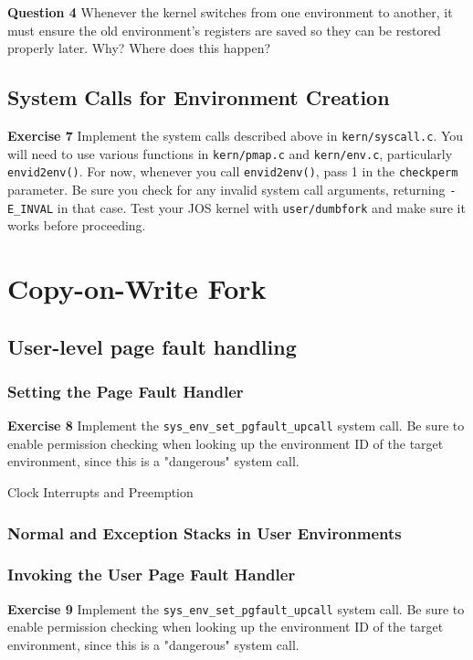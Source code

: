 \documentclass[11pt]{article}
\begin{document}
\begin{framed}
\noindent\textbf{Question 4} Whenever the kernel switches from one environment to another, it must ensure the old environment's registers are saved so they can be restored properly later. Why? Where does this happen?
\end{framed}

\subsection{System Calls for Environment Creation}
\begin{framed}
\noindent\textbf{Exercise 7} Implement the system calls described above in \lstinline|kern/syscall.c|. You will need to use various functions in \lstinline|kern/pmap.c| and \lstinline|kern/env.c|, particularly \lstinline|envid2env()|. For now, whenever you call \lstinline|envid2env()|, pass 1 in the \lstinline|checkperm| parameter. Be sure you check for any invalid system call arguments, returning \lstinline|-E_INVAL| in that case. Test your JOS kernel with \lstinline|user/dumbfork| and make sure it works before proceeding.
\end{framed}

\section{Copy-on-Write Fork}

\subsection{User-level page fault handling}
\subsubsection{Setting the Page Fault Handler}
\begin{framed}
\noindent\textbf{Exercise 8} Implement the \lstinline|sys_env_set_pgfault_upcall| system call. Be sure to enable permission checking when looking up the environment ID of the target environment, since this is a "dangerous" system call.
\end{framed}Clock Interrupts and Preemption
\subsubsection{Normal and Exception Stacks in User Environments}
\subsubsection{Invoking the User Page Fault Handler}
\begin{framed}
\noindent\textbf{Exercise 9} Implement the \lstinline|sys_env_set_pgfault_upcall| system call. Be sure to enable permission checking when looking up the environment ID of the target environment, since this is a "dangerous" system call.
\end{framed}
\end{document}
